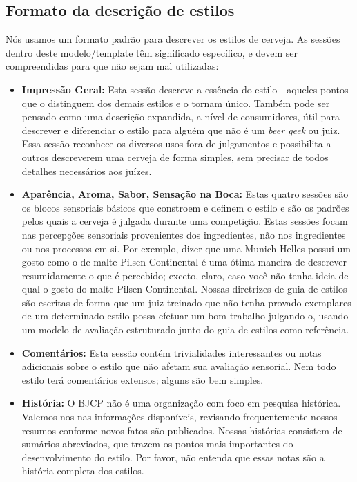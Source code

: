 \subsection*{Formato da descrição de estilos}
Nós usamos um formato padrão para descrever os estilos de cerveja. As sessões dentro deste modelo/template têm significado específico, e devem ser compreendidas para que não sejam mal utilizadas:
\begin{itemize}
\item \textbf{Impressão Geral:} Esta sessão descreve a essência do estilo - aqueles pontos que o distinguem dos demais estilos e o tornam único. Também pode ser pensado como uma descrição expandida, a nível de consumidores, útil para descrever e diferenciar o estilo para alguém que não é um \textit{beer geek} ou juiz. Essa sessão reconhece os diversos usos fora de julgamentos e possibilita a outros descreverem uma cerveja de forma simples, sem precisar de todos detalhes necessários aos juízes.
\item \textbf{Aparência, Aroma, Sabor, Sensação na Boca:} Estas quatro sessões são os blocos sensoriais básicos que constroem e definem o estilo e são os padrões pelos quais a cerveja é julgada durante uma competição. Estas sessões focam nas percepções sensoriais provenientes dos ingredientes, não nos ingredientes ou nos processos em si. Por exemplo, dizer que uma Munich Helles possui um gosto como o de malte Pilsen Continental é uma ótima maneira de descrever resumidamente o que é percebido; exceto, claro, caso você não tenha ideia de qual o gosto do malte Pilsen Continental. Nossas diretrizes de guia de estilos são escritas de forma que um juiz treinado que não tenha provado exemplares de um determinado estilo possa efetuar um bom trabalho julgando-o, usando um modelo de avaliação estruturado junto do guia de estilos como referência.
\item \textbf{Comentários:} Esta sessão contém trivialidades interessantes ou notas adicionais sobre o estilo que não afetam sua avaliação sensorial. Nem todo estilo terá comentários extensos; alguns são bem simples.
\item \textbf{História:} O BJCP não é uma organização com foco em pesquisa histórica. Valemos-nos nas informações disponíveis, revisando frequentemente nossos resumos conforme novos fatos são publicados. Nossas histórias consistem de sumários abreviados, que trazem os pontos mais importantes do desenvolvimento do estilo. Por favor, não entenda que essas notas são a história completa dos estilos.

\end{itemize}
